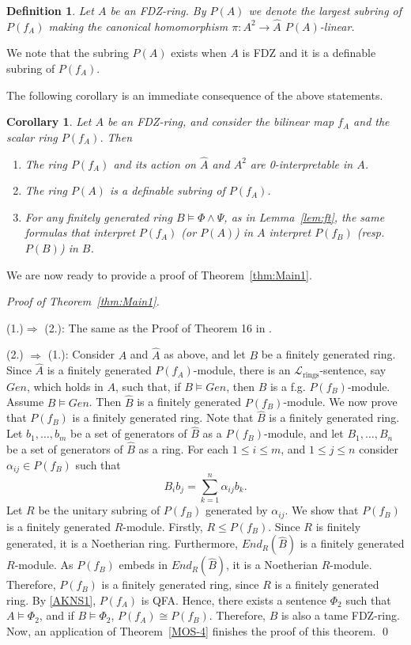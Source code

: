 \documentclass{article}
\newtheorem{definition}{Definition}[section]
\newtheorem{cor}[theorem]{Corollary}
\theoremstyle{remark}
\newcommand{\Lrings}{\mathcal{L}_{\text{rings}}}
\def\barA{\hat{A}}
\def\barB{\hat{B}}
\begin{document}
\begin{definition}
 Let $A$ be an FDZ-ring. By $P(A)$ we denote the largest subring of $P(f_A)$ making the canonical homomorphism $\pi: A^2 \to \hat{A}$ $P(A)$-linear.
\end{definition}
We note that the subring $P(A)$ exists when $A$ is FDZ and it is a definable subring of $P(f_A)$.  

The following corollary is an immediate consequence of the above statements.

\begin{cor}\label{P(f)-interpret:cor} Let $A$ be an FDZ-ring, and consider the bilinear map $f_A$ and the scalar ring $P(f_A)$. Then

\begin{enumerate}
\item The ring $P(f_A)$ and its action on $\barA$ and $A^2$ are 0-interpretable in $A$. 
\item  The ring $P(A)$ is a definable subring of $P(f_A)$.
\item For any finitely generated ring $B\models \Phi \wedge \Psi$, as in Lemma~\ref{lem:ft}, the same formulas that interpret $P(f_A)$ (or $P(A)$) in $A$ interpret $P(f_B)$ (resp. $P(B)$) in $B$.\end{enumerate}
\end{cor}




We are now ready to provide a proof of Theorem~\ref{thm:Main1}.


\noindent \textit{Proof of Theorem~\ref{thm:Main1}.}

\noindent (1.)$\Rightarrow$ (2.): The same as the Proof of Theorem 16 in \cite{Rich}.\medskip

\noindent (2.) $\Rightarrow$ (1.): Consider $A$ and $\barA$ as above, and let $B$ be a finitely generated ring. Since $\barA$ is a finitely generated $P(f_A)$-module,
 there is an $\Lrings$-sentence, say $Gen$, which holds in $A$, such that, if $B\models Gen$, then $B$ is a f.g. $P(f_B)$-module. Assume $B\models Gen$. Then $\barB$ is a finitely generated $P(f_B)$-module. We now prove that $P(f_B)$ is a finitely generated ring. Note that $\barB$ is a finitely generated ring. Let $b_1,\ldots, b_m$ be a set of generators of $\barB$ as a $P(f_B)$-module, and let $B_1, \ldots, B_n$ be a set of generators of $\barB$ as a ring. For each $1\leq i\leq m$, and $1\leq j\leq n$ consider $\alpha_{ij}\in P(f_B)$ such that
 $$B_ib_j= \sum_{k=1}^n \alpha_{ij}b_k.$$
 Let $R$ be the unitary subring of $P(f_B)$ generated by $\alpha_{ij}$. We show that $P(f_B)$ is a finitely generated $R$-module. Firstly, $R\leq P(f_B)$. Since $R$ is finitely generated, it is a Noetherian ring. Furthermore, $End_R(\barB)$ is a finitely generated $R$-module. As $P(f_B)$ embeds in $End_R(\barB)$, it is a Noetherian $R$-module. Therefore, $P(f_B)$ is a finitely generated ring, since $R$ is a finitely generated ring. By \ref{AKNS1}, $P(f_A)$ is QFA. Hence, there exists a sentence $\Phi_2$ such that $A\models\Phi_2$, and if $B\models\Phi_2$, $P(f_A)\cong P(f_B)$. Therefore, $B$ is also a tame FDZ-ring. Now, an application of Theorem~\ref{MOS-4} finishes the proof of this theorem. \qed
\end{document}
